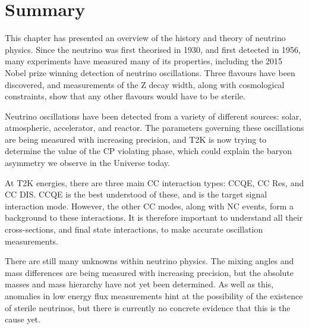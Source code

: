 \section{Summary}

This chapter has presented an overview of the history and theory of neutrino physics. Since the neutrino was first theorised in 1930, and first detected in 1956, many experiments have measured many of its properties, including the 2015 Nobel prize winning detection of neutrino oscillations. Three flavours have been discovered, and measurements of the Z decay width, along with cosmological constraints, show that any other flavours would have to be sterile.

Neutrino oscillations have been detected from a variety of different sources: solar, atmospheric, accelerator, and reactor. The parameters governing these oscillations are being measured with increasing precision, and T2K is now trying to determine the value of the CP violating phase, which could explain the baryon asymmetry we observe in the Universe today. 

At T2K energies, there are three main CC interaction types: CCQE, CC Res, and CC DIS. CCQE is the best understood of these, and is the target signal interaction mode. However, the other CC modes, along with NC events, form a background to these interactions. It is therefore important to understand all their cross-sections, and final state interactions, to make accurate oscillation measurements.

There are still many unknowns within neutrino physics. The mixing angles and mass differences are being measured with increasing precision, but the absolute masses and mass hierarchy have not yet been determined. As well as this, anomalies in low energy flux measurements hint at the possibility of the existence of sterile neutrinos, but there is currently no concrete evidence that this is the cause yet. 

\newpage
